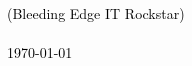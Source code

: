 \newcommand{\cccvname}{Bernd Zuther}
\newcommand{\cccvjobtitle}{Bleeding Edge IT Rockstar}

\NoBgThispage
\vspace*{18.5cm}
\noindent
\textcolor{black}{
{\huge (\cccvjobtitle)}\\
\\[8pt]
{\today}
}
